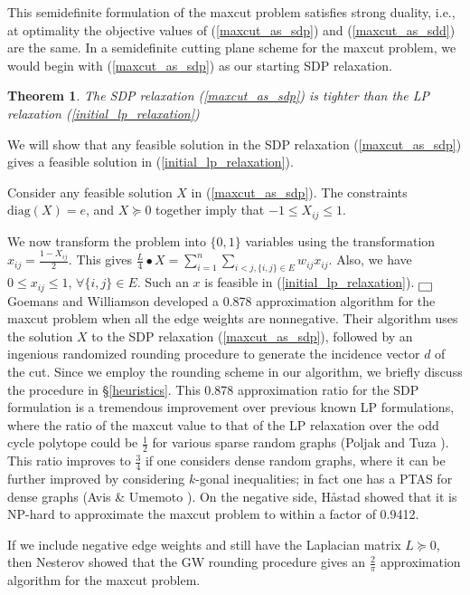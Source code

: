 \documentclass[12pt]{article}
\newtheorem{theorem}{Theorem}
\newenvironment{proof}{{\raggedright\bf
Proof:}\quad}{\hspace*{\fill}$\fbox{ }$\\}
\begin{document}
This semidefinite formulation of the maxcut problem satisfies
strong duality, i.e., at optimality the objective values of
(\ref{maxcut_as_sdp}) and (\ref{maxcut_as_sdd}) are the same. In a
semidefinite cutting plane scheme for the maxcut problem, we would
begin with (\ref{maxcut_as_sdp}) as our starting SDP relaxation.
\begin{theorem}
\label{sdp_is_stronger} The SDP relaxation (\ref{maxcut_as_sdp})
is tighter than the LP relaxation (\ref{initial_lp_relaxation})
\end{theorem}
\begin{proof}
We will show that any feasible solution in the SDP relaxation
(\ref{maxcut_as_sdp}) gives a feasible solution in
(\ref{initial_lp_relaxation}).

Consider any feasible solution $X$ in (\ref{maxcut_as_sdp}). The
constraints $\mbox{diag}(X) = e$, and $X \succeq 0$ together imply
that $ -1 \le X_{ij} \le 1$.

We now transform the problem into $\{0,1\}$ variables using the
transformation $x_{ij} = \frac{1-X_{ij}}{2}$. This gives
$\frac{L}{4} \bullet X = \displaystyle \sum_{i=1}^n \displaystyle
\sum_{i < j, \{i,j\} \in E} w_{ij}x_{ij}$. Also, we have $ 0 \le
x_{ij} \le 1$, $\forall \{i,j\} \in E$. Such an $x$ is feasible in
(\ref{initial_lp_relaxation}).
\end{proof}
Goemans and Williamson \cite{goemans1} developed a 0.878
approximation algorithm for the maxcut problem when all the edge
weights are nonnegative. Their algorithm uses the solution $X$ to
the SDP relaxation (\ref{maxcut_as_sdp}), followed by an ingenious
randomized rounding procedure to generate the incidence vector $d$
of the cut. Since we employ the rounding scheme in our algorithm,
we briefly discuss the procedure in \S\ref{heuristics}. This 0.878
approximation ratio for the SDP formulation is a tremendous
improvement over previous known LP formulations, where the ratio
of the maxcut value to that of the LP relaxation over the odd
cycle polytope could be $\frac{1}{2}$ for various sparse random
graphs (Poljak and Tuza \cite{poljak_tuza}). This ratio improves
to $\frac{3}{4}$ if one considers dense random graphs, where it
can be further improved by considering $k$-gonal inequalities; in
fact one has a PTAS for dense graphs (Avis \& Umemoto
\cite{avis_umemoto}). On the negative side, H\r{a}stad
\cite{hastad1} showed that it is NP-hard to approximate the maxcut
problem to within a factor of 0.9412.

If we include negative edge weights and still have the Laplacian
matrix $L \succeq 0$, then Nesterov \cite{nesterov10} showed that
the GW rounding procedure gives an $\frac{2}{\pi}$ approximation
algorithm for the maxcut problem.
\end{document}
